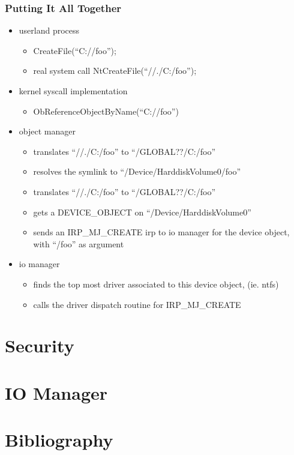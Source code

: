 \begin{frame}
  \frametitle{Putting It All Together}

  \begin{itemize}
    \item
      userland process
      \begin{itemize}
        \item
          CreateFile(``C://foo'');
        \item
          real system call NtCreateFile(``//./C:/foo'');
      \end{itemize}

    \item
      kernel syscall implementation
      \begin{itemize}
        \item
          ObReferenceObjectByName(``C://foo'')
      \end{itemize}

    \item
      object manager
      \begin{itemize}
        \item
          translates ``//./C:/foo'' to ``/GLOBAL??/C:/foo''
        \item
          resolves the symlink to ``/Device/HarddiskVolume0/foo''
        \item
          translates ``//./C:/foo'' to ``/GLOBAL??/C:/foo''
        \item
          gets a DEVICE\_OBJECT on ``/Device/HarddiskVolume0''
        \item
          sends an IRP\_MJ\_CREATE irp to io manager for the device object,  with ``/foo'' as argument
      \end{itemize}

    \item
      io manager
      \begin{itemize}
        \item
          finds the top most driver associated to this device object, (ie. ntfs)
        \item
          calls the driver dispatch routine for IRP\_MJ\_CREATE
      \end{itemize}

  \end{itemize}

\end{frame}

%
%

\section{Security}

%
%

\section{IO Manager}

%
%

\section{Bibliography}


